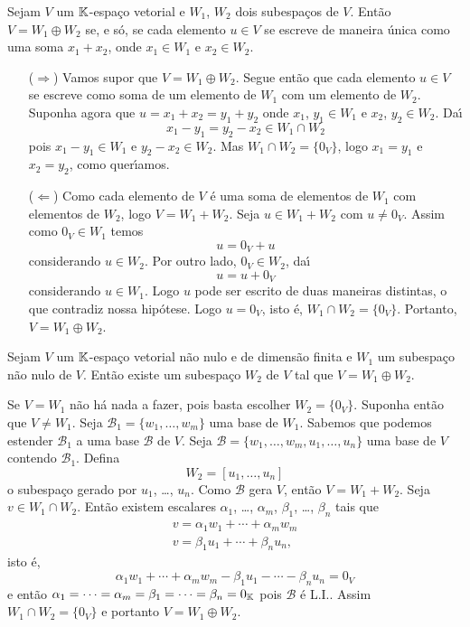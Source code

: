 \begin{proposicao}
	Sejam $V$ um $\mathbb{K}$-espa\c{c}o vetorial e $W_1$, $W_2$ dois subespa\c{c}os de $V$. Ent\~ao $V = W_1 \oplus W_2$ se, e s\'o, se
	cada elemento $u \in V$ se escreve de maneira \'unica como uma soma $x_1 + x_2$, onde $x_1 \in W_1$ e $x_2 \in W_2$.
\end{proposicao}
\begin{prova}
	\begin{itemize}
		\item[($\Rightarrow$)] Vamos supor que $V = W_1 \oplus W_2.$ Segue ent\~ao que cada elemento $u \in V$ se escreve
		como soma de um elemento de $W_1$ com um elemento de $W_2$. Suponha agora que $u = x_1 + x_2 = y_1 + y_2$ onde
		$x_1$, $y_1 \in W_1$ e $x_2$, $y_2 \in W_2$. Da{\'\i}
		\[
			x_1 - y_1 = y_2 - x_2 \in W_1 \cap W_2
		\]
		pois $x_1 - y_1 \in W_1$ e $y_2 - x_2 \in W_2$. Mas $W_1 \cap W_2 = \{0_V\}$, logo $x_1 = y_1$ e $x_2 = y_2$,
		como quer{\'\i}amos.
		\item[($\Leftarrow$)] Como cada elemento de $V$ \'e uma soma de elementos de $W_1$ com elementos de $W_2$, logo
		$V = W_1 + W_2$. Seja $u \in W_1 + W_2$ com $u \ne 0_V$. Assim como $0_V \in W_1$ temos
		\[
			u = 0_V + u
		\]
		considerando $u \in W_2$. Por outro lado, $0_V \in W_2$, da{\'\i}
		\[
			u = u + 0_V
		\]
		considerando $u \in W_1$. Logo $u$ pode ser escrito de duas maneiras distintas, o que contradiz nossa hip\'otese.
		Logo $u = 0_V$, isto \'e, $W_1 \cap W_2 = \{0_V\}$. Portanto, $V = W_1 \oplus W_2$.
	\end{itemize}
\end{prova}

\begin{proposicao}
	Sejam $V$ um $\mathbb{K}$-espa\c{c}o vetorial n\~ao nulo e de dimens\~ao finita e $W_1$ um subespa\c{c}o n\~ao nulo de $V$. Ent\~ao
	existe um subespa\c{c}o $W_2$ de $V$ tal que $V = W_1 \oplus W_2$.
\end{proposicao}
\begin{prova}
	Se $V = W_1$ n\~ao h\'a nada a fazer, pois basta escolher $W_2 = \{0_V\}$. Suponha ent\~ao que $V \ne W_1$. Seja
	$\mathcal{B}_1 = \{w_1, \dots, w_m\}$ uma base de $W_1$. Sabemos que podemos estender $\mathcal{B}_1$ a uma base
	$\mathcal{B}$ de $V$. Seja $\mathcal{B} = \{w_1, \dots, w_m, u_1, \dots, u_n\}$ uma base de $V$ contendo
	$\mathcal{B}_1$. Defina
	\[
		W_2 = [u_1, \dots, u_n]
	\]
	o subespa\c{c}o gerado por $u_1$, \dots, $u_n$. Como $\mathcal{B}$ gera $V$, ent\~ao $V = W_1 + W_2$. Seja $v \in W_1 \cap
	W_2$. Ent\~ao existem escalares $\alpha_1$, \dots, $\alpha_m$, $\beta_1$, \dots, $\beta_n$ tais que
	\begin{align*}
		v = \alpha_1w_1 + \cdots + \alpha_mw_m\\
		v = \beta_1u_1 + \cdots + \beta_nu_n,
	\end{align*}
	isto \'e,
	\[
		\alpha_1w_1 + \cdots + \alpha_mw_m - \beta_1u_1 - \cdots - \beta_nu_n = 0_V
	\]
	e ent\~ao $\alpha_1 = \dots = \alpha_m = \beta_1 = \dots = \beta_n = 0_{\mathbb{K}}$ pois $\mathcal{B}$ \'e L.I.. Assim $W_1
	\cap W_2 = \{0_V\}$ e portanto $V = W_1 \oplus W_2$.
\end{prova}

